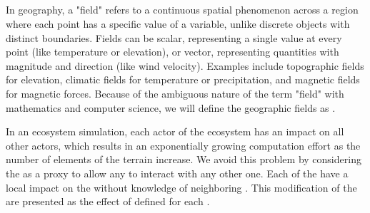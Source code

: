 


\subsection{ }
\label{sec:env-obj_communication}

In geography, a "field" refers to a continuous spatial phenomenon across a region where each point has a specific value of a variable, unlike discrete objects with distinct boundaries. Fields can be scalar, representing a single value at every point (like temperature or elevation), or vector, representing quantities with magnitude and direction (like wind velocity). Examples include topographic fields for elevation, climatic fields for temperature or precipitation, and magnetic fields for magnetic forces. Because of the ambiguous nature of the term "field" with mathematics and computer science, we will define the geographic fields as .

In an ecosystem simulation, each actor of the ecosystem has an impact on all other actors, which results in an exponentially growing computation effort as the number of elements of the terrain increase. We avoid this problem by considering the  as a proxy to allow any  to interact with any other one. Each of the  have a local impact on the  without knowledge of neighboring . This modification of the  are presented as the effect of  defined for each . %

